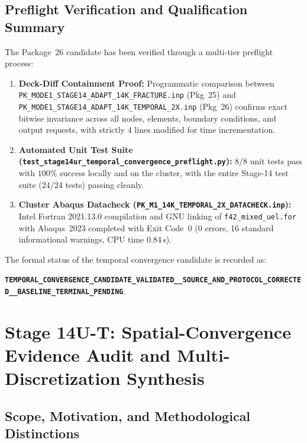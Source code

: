 \subsection{Preflight Verification and Qualification Summary}
\label{subsec:stage14ur_preflight_results}

The Package~26 candidate has been verified through a multi-tier preflight process:
\begin{enumerate}
    \item \textbf{Deck-Diff Containment Proof:} Programmatic comparison between \texttt{PK\_MODE1\_STAGE14\_ADAPT\_14K\_FRACTURE.inp} (Pkg~25) and \texttt{PK\_MODE1\_STAGE14\_ADAPT\_14K\_TEMPORAL\_2X.inp} (Pkg~26) confirms exact bitwise invariance across all nodes, elements, boundary conditions, and output requests, with strictly $4$ lines modified for time incrementation.
    \item \textbf{Automated Unit Test Suite (\texttt{test\_stage14ur\_temporal\_convergence\_preflight.py}):} $8/8$ unit tests pass with $100\%$ success locally and on the cluster, with the entire Stage-14 test suite ($24/24$ tests) passing cleanly.
    \item \textbf{Cluster Abaqus Datacheck (\texttt{PK\_M1\_14K\_TEMPORAL\_2X\_DATACHECK.inp}):} Intel Fortran 2021.13.0 compilation and GNU linking of \texttt{f42\_mixed\_uel.for} with Abaqus~2023 completed with Exit Code~0 (0 errors, 16 standard informational warnings, CPU time $0.84\,\mathrm{s}$).
\end{enumerate}

The formal status of the temporal convergence candidate is recorded as:
\begin{center}
{\footnotesize\textbf{\texttt{TEMPORAL\_CONVERGENCE\_CANDIDATE\_VALIDATED\_\_SOURCE\_AND\_PROTOCOL\_CORRECTED\_\_BASELINE\_TERMINAL\_PENDING}}}.
\end{center}
\section{Stage 14U-T: Spatial-Convergence Evidence Audit and Multi-Discretization Synthesis}
\label{sec:stage14ut_spatial_convergence_audit}

\subsection{Scope, Motivation, and Methodological Distinctions}
\label{subsec:stage14ut_motivation}

